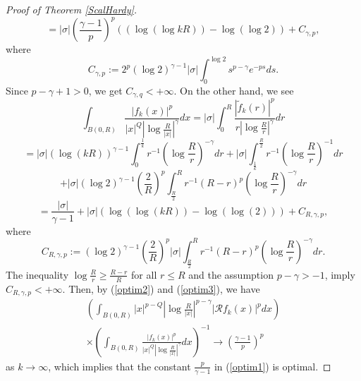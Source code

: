 \documentclass[a4paper,12pt,reqno]{amsart}
\renewcommand\eqref[1]{(\ref{#1})} %
\numberwithin{equation}{section}
\theoremstyle{plain}
\theoremstyle{definition}
\begin{document}
\begin{proof}[Proof of Theorem \ref{ScalHardy}]
\begin{equation} \label{optim2}
=|\sigma|\left(\frac{\gamma-1}{p}\right)^{p}\left((\log(\log kR))-\log(\log 2)\right)+C_{\gamma,p},
\end{equation}
where $$C_{\gamma,p}:=2^{p}(\log2)^{\gamma-1}|\sigma|\int_{0}^{\log2}s^{p-\gamma}
e^{-ps}ds.
$$
Since $p-\gamma+1>0$, we get $C_{\gamma,q}<+\infty$. On the other hand, we see
$$
\int_{B(0,R)}\frac{|f_{k}(x)|^{p}}{|x|^{Q}\left|\log\frac{R}{|x|}\right|^{\gamma}}dx
=|\sigma|\int_{0}^{R}\frac{|\widetilde{f}_{k}(r)|^{p}}{r\left|\log\frac{R}{r}\right|^{\gamma}}dr
$$$$=|\sigma|(\log(kR))^{\gamma-1}\int_{0}^{\frac{1}{k}}r^{-1}
\left(\log\frac{R}{r}\right)^{-\gamma}dr
+|\sigma|\int_{\frac{1}{k}}^{\frac{R}{2}}r^{-1}
\left(\log\frac{R}{r}\right)^{-1}dr$$$$+|\sigma|(\log2)^{\gamma-1}\left(\frac{2}{R}\right)^{p}
\int_{\frac{R}{2}}^{R}r^{-1}
(R-r)^{p}\left(\log\frac{R}{r}\right)^{-\gamma}dr
$$
\begin{equation}\label{optim3}
=\frac{|\sigma|}{\gamma-1}+|\sigma|(\log(\log(kR))-\log(\log(2)))
+C_{R,\gamma,p},
\end{equation}
where
$$
C_{R,\gamma,p}:=(\log2)^{\gamma-1}\left(\frac{2}{R}\right)^{p}|\sigma|\int_{\frac{R}{2}}^{R}r^{-1}
(R-r)^{p}\left(\log\frac{R}{r}\right)^{-\gamma}dr.
$$
The inequality $\log\frac{R}{r}\geq \frac{R-r}{R}$ for all $r\leq R$ and the assumption $p-\gamma>-1$, imply $C_{R,\gamma,p}<+\infty$. Then, by \eqref{optim2} and \eqref{optim3}, we have
\begin{multline*}
\left(\int_{B(0,R)}|x|^{p-Q}
\left|\log\frac{R}{|x|}\right|^{p-\gamma}\left|\mathcal{R}f_{k}(x)\right|
^{p}dx\right)\\ \times \left(\int_{B(0,R)}\frac{|f_{k}(x)|^{p}}{|x|^{Q}\left|\log\frac{R}{|x|}\right|^{\gamma}}dx\right)^{-1}
\rightarrow \left(\frac{\gamma-1}{p}\right)^{p}
\end{multline*}
as $k \rightarrow \infty$, which implies that the constant $\frac{p}{\gamma-1}$ in \eqref{optim1} is optimal.
\end{proof}
\end{document}

